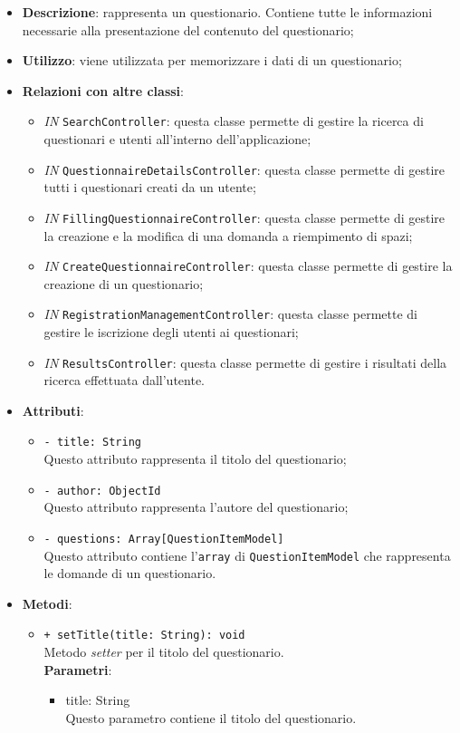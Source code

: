 		\begin{itemize}
			\item \textbf{Descrizione}: rappresenta un questionario. Contiene tutte le informazioni necessarie alla presentazione del contenuto del questionario;
			\item \textbf{Utilizzo}: viene utilizzata per memorizzare i dati di un questionario;
			\item \textbf{Relazioni con altre classi}: 
			\begin{itemize}
				\item \textit{IN} \texttt{SearchController}: questa classe permette di gestire la ricerca di questionari e utenti all'interno dell'applicazione;
				\item \textit{IN} \texttt{QuestionnaireDetailsController}: questa classe permette di gestire tutti i questionari creati da un utente; 
				\item \textit{IN} \texttt{FillingQuestionnaireController}: questa classe permette di gestire la creazione e la modifica di una domanda a riempimento di spazi;
				\item \textit{IN} \texttt{CreateQuestionnaireController}: questa classe permette di gestire la creazione di un questionario;
				\item \textit{IN} \texttt{RegistrationManagementController}: questa classe permette di gestire le iscrizione degli utenti ai questionari;
				\item \textit{IN} \texttt{ResultsController}: questa classe permette di gestire i risultati della ricerca effettuata dall'utente.
			\end{itemize}
			\item \textbf{Attributi}: 
			\begin{itemize}
				\item \texttt{- title: String}\\
				Questo attributo rappresenta il titolo del questionario;
				\item \texttt{- author: ObjectId}\\
				Questo attributo rappresenta l'autore del questionario;
				\item \texttt{- questions: Array[QuestionItemModel]}\\
				Questo attributo contiene l'\texttt{array} di \texttt{QuestionItemModel} che rappresenta le domande di un questionario.
			\end{itemize}
			\item \textbf{Metodi}: 
			\begin{itemize}
				\item \texttt{+ setTitle(title: String): void} \\
				Metodo \textit{setter} per il titolo del questionario.\\
				\textbf{Parametri}:
				\begin{itemize}
					\item {title: String}\\
					Questo parametro contiene il titolo del questionario. 
				\end{itemize}
				

\end{itemize}
\end{itemize}

